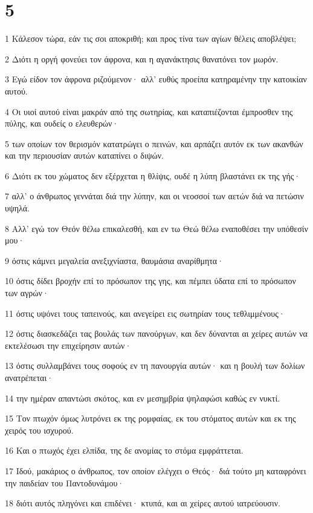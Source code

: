\chapter{5}

\par 1 Κάλεσον τώρα, εάν τις σοι αποκριθή; και προς τίνα των αγίων θέλεις αποβλέψει;
\par 2 Διότι η οργή φονεύει τον άφρονα, και η αγανάκτησις θανατόνει τον μωρόν.
\par 3 Εγώ είδον τον άφρονα ριζούμενον· αλλ' ευθύς προείπα κατηραμένην την κατοικίαν αυτού.
\par 4 Οι υιοί αυτού είναι μακράν από της σωτηρίας, και καταπιέζονται έμπροσθεν της πύλης, και ουδείς ο ελευθερών·
\par 5 των οποίων τον θερισμόν κατατρώγει ο πεινών, και αρπάζει αυτόν εκ των ακανθών και την περιουσίαν αυτών καταπίνει ο διψών.
\par 6 Διότι εκ του χώματος δεν εξέρχεται η θλίψις, ουδέ η λύπη βλαστάνει εκ της γής·
\par 7 αλλ' ο άνθρωπος γεννάται διά την λύπην, και οι νεοσσοί των αετών διά να πετώσιν υψηλά.
\par 8 Αλλ' εγώ τον Θεόν θέλω επικαλεσθή, και εν τω Θεώ θέλω εναποθέσει την υπόθεσίν μου·
\par 9 όστις κάμνει μεγαλεία ανεξιχνίαστα, θαυμάσια αναρίθμητα·
\par 10 όστις δίδει βροχήν επί το πρόσωπον της γης, και πέμπει ύδατα επί το πρόσωπον των αγρών·
\par 11 όστις υψόνει τους ταπεινούς, και ανεγείρει εις σωτηρίαν τους τεθλιμμένους·
\par 12 όστις διασκεδάζει τας βουλάς των πανούργων, και δεν δύνανται αι χείρες αυτών να εκτελέσωσι την επιχείρησιν αυτών·
\par 13 όστις συλλαμβάνει τους σοφούς εν τη πανουργία αυτών· και η βουλή των δολίων ανατρέπεται·
\par 14 την ημέραν απαντώσι σκότος, και εν μεσημβρία ψηλαφώσι καθώς εν νυκτί.
\par 15 Τον πτωχόν όμως λυτρόνει εκ της ρομφαίας, εκ του στόματος αυτών και εκ της χειρός του ισχυρού.
\par 16 Και ο πτωχός έχει ελπίδα, της δε ανομίας το στόμα εμφράττεται.
\par 17 Ιδού, μακάριος ο άνθρωπος, τον οποίον ελέγχει ο Θεός· διά τούτο μη καταφρόνει την παιδείαν του Παντοδυνάμου·
\par 18 διότι αυτός πληγόνει και επιδένει· κτυπά, και αι χείρες αυτού ιατρεύουσιν.
